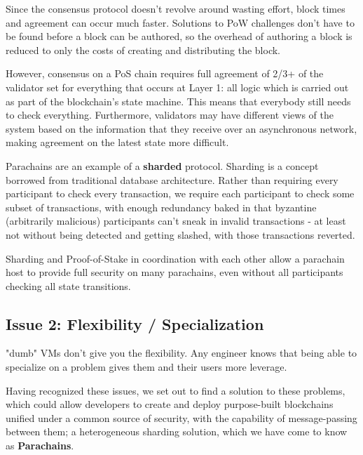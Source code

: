 Since the consensus protocol doesn't revolve around wasting effort, block times
and agreement can occur much faster. Solutions to PoW challenges don't have to
be found before a block can be authored, so the overhead of authoring a block is
reduced to only the costs of creating and distributing the block.
\newline

However, consensus on a PoS chain requires full agreement of 2/3+ of the
validator set for everything that occurs at Layer 1: all logic which is carried
out as part of the blockchain's state machine. This means that everybody still
needs to check everything. Furthermore, validators may have different views of
the system based on the information that they receive over an asynchronous
network, making agreement on the latest state more difficult.
\newline

Parachains are an example of a \textbf{sharded} protocol. Sharding is a concept
borrowed from traditional database architecture. Rather than requiring every
participant to check every transaction, we require each participant to check
some subset of transactions, with enough redundancy baked in that byzantine
(arbitrarily malicious) participants can't sneak in invalid transactions - at
least not without being detected and getting slashed, with those transactions
reverted.
\newline

Sharding and Proof-of-Stake in coordination with each other allow a parachain
host to provide full security on many parachains, even without all participants
checking all state transitions.


\subsection{Issue 2: Flexibility / Specialization}

"dumb" VMs don't give you the flexibility. Any engineer knows that being able to
specialize on a problem gives them and their users more leverage. 
\newline

Having recognized these issues, we set out to find a solution to these problems,
which could allow developers to create and deploy purpose-built blockchains
unified under a common source of security, with the capability of
message-passing between them; a heterogeneous sharding solution, which we have
come to know as \textbf{Parachains}.

